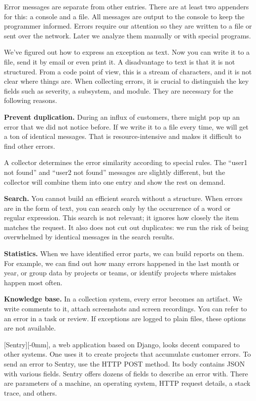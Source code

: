 
Error messages are separate from other entries. There are at least two appenders for this: a console and a file. All messages are output to the console to keep the programmer informed. Errors require our attention so they are written to a file or sent over the network. Later we analyze them manually or with special programs.

We've figured out how to express an exception as text. Now you can write it to a file, send it by email or even print it. A disadvantage to text is that it is not structured. From a code point of view, this is a stream of characters, and it is not clear where things are. When collecting errors, it is crucial to distinguish the key fields such as severity, a subsystem, and module. They are necessary for the following reasons.

\textbf{Prevent duplication.} During an influx of customers, there might pop up an error that we did not notice before. If we write it to a file every time, we will get a ton of identical messages. That is resource-intensive and makes it difficult to find other errors.

A collector determines the error similarity according to special rules. The ``user1 not found'' and ``user2 not found'' messages are slightly different, but the collector will combine them into one entry and show the rest on demand.

\textbf{Search.} You cannot build an efficient search without a structure.
When errors are in the form of text, you can search only by the occurrence of a word or regular expression. This search is not relevant; it ignores how closely the item matches the request. It also does not cut out duplicates: we run the risk of being overwhelmed by identical messages in the search results.

\textbf{Statistics.} When we have identified error parts, we can build reports on them. For example, we can find out how many errors happened in the last month or year, or group data by projects or teams, or identify projects where mistakes happen most often.

\textbf{Knowledge base.} In a collection system, every error becomes an artifact. We write comments to it, attach screenshots and screen recordings. You can refer to an error in a task or review. If exceptions are logged to plain files, these options are not available.


[Sentry][-0mm], a web application based on Django, looks decent compared to other systems. One uses it to create projects that accumulate customer errors. To send an error to Sentry, use the HTTP POST method. Its body contains JSON with various fields. Sentry offers dozens of fields to describe an error with. There are parameters of a machine, an operating system, HTTP request details, a stack trace, and others.

